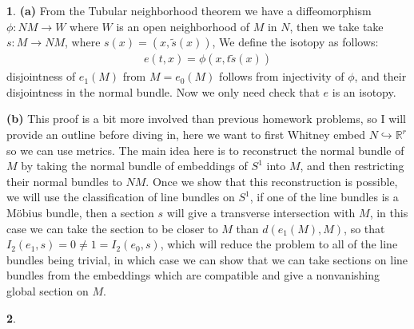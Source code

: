 \documentclass[10.5pt]{article}
\theoremstyle{definition}
\newtheorem{pb}{}
\begin{document}
    \begin{pb}
        \textbf{(a)} From the Tubular neighborhood theorem we have a diffeomorphism \(\phi: NM \to W\) where \(W\) is an open neighborhood of \(M\) in \(N\), then we take take \(s: M \to NM\), where \(s(x) = (x,\tilde{s}(x))\), We define the isotopy as follows:
        \begin{align*}
            e(t,x) = \phi(x,t\tilde{s}(x))
        \end{align*}
        disjointness of \(e_1(M)\) from \(M = e_0(M)\) follows from injectivity of \(\phi\), and their disjointness in the normal bundle. Now we only need check that \(e\) is an isotopy.

        \textbf{(b)} This proof is a bit more involved than previous homework problems, so I will provide an outline before diving in, here we want to first Whitney embed \(N \hookrightarrow \mathbb{R}^r\) so we can use metrics. The main idea here is to reconstruct the normal bundle of \(M\) by taking the normal bundle of embeddings of \(S^1\) into \(M\), and then restricting their normal bundles to \(NM\). Once we show that this reconstruction is possible, we will use the classification of line bundles on \(S^1\), if one of the line bundles is a M\"obius bundle, then a section \(s\) will give a transverse intersection with \(M\), in this case we can take the section to be closer to \(M\) than \(d(e_1(M),M)\), so that \(I_2(e_1,s) = 0 \neq 1 = I_2(e_0,s)\), which will reduce the problem to all of the line bundles being trivial, in which case we can show that we can take sections on line bundles from the embeddings which are compatible and give a nonvanishing global section on \(M\).
    \end{pb}
    \begin{pb}
        
    \end{pb}
\end{document}
